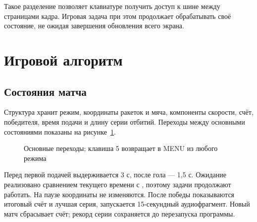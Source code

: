 \documentclass[a4paper,12pt]{article}
\newcommand{\code}[1]{\texttt{\detokenize{#1}}}
\begin{document}
Такое разделение позволяет клавиатуре получить доступ к шине между
страницами кадра. Игровая задача при этом продолжает обрабатывать своё
состояние, не ожидая завершения обновления всего экрана.

\clearpage
\section{Игровой алгоритм}
\subsection{Состояния матча}
Структура \code{Pong} хранит режим, координаты ракеток и мяча, компоненты
скорости, счёт, победителя, время подачи и длину серии отбитий.
Переходы между основными состояниями показаны на рисунке~\ref{fig:states}.

\begin{figure}[H]
\centering
{}
\caption{Основные переходы; клавиша 5 возвращает в MENU из любого режима}
\label{fig:states}
\end{figure}

Перед первой подачей выдерживается 3 с, после гола --- 1,5 с.
Ожидание реализовано сравнением текущего времени с \code{deadline},
поэтому задачи продолжают работать. На паузе координаты не изменяются.
После победы показываются итоговый счёт и лучшая серия, запускается
15-секундный аудиофрагмент. Новый матч сбрасывает счёт; рекорд серии
сохраняется до перезапуска программы.
\end{document}
